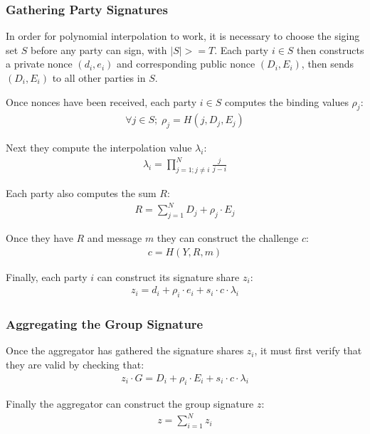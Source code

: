 \documentclass{article}
\begin{document}
\newpage
\onecolumn
\subsubsection{
  Gathering Party Signatures
}

In order for polynomial interpolation to work, it is necessary to choose the siging set $S$ before any party can sign, with $|S| >= T$.  Each party $i \in S$ then constructs a private nonce $(d_i,e_i)$ and corresponding public nonce $(D_i,E_i)$, then sends $(D_i,E_i)$ to all other parties in $S$.

Once nonces have been received, each party $i \in S$ computes the binding values $\rho_j$:
\begin{align}
  \forall j \in S;\;\rho_j = H(j, D_j, E_j)
\end{align}

Next they compute the interpolation value $\lambda_i$:
\begin{align}
  \lambda_i = \prod_{j=1; j \neq i}^{N} \frac{j}{j - i}
\end{align}

Each party also computes the sum $R$:
\begin{align}
  R = \sum_{j=1}^{N} D_j + \rho_j \cdot E_j
\end{align}

Once they have $R$ and message $m$ they can construct the challenge $c$:
\begin{align}
  c = H(Y, R, m)
\end{align}

Finally, each party $i$ can construct its signature share $z_i$:
\begin{align}
  z_i = d_i + \rho_i \cdot e_i + s_i \cdot c \cdot \lambda_i
\end{align}


\subsubsection{
  Aggregating the Group Signature
}

Once the aggregator has gathered the signature shares $z_i$, it must first verify that they are valid by checking that:
\begin{align}
  z_i \cdot G = D_i + \rho_i \cdot E_i + s_i \cdot c \cdot \lambda_i
\end{align}

Finally the aggregator can construct the group signature $z$:
\begin{align}
  z = \sum_{i=1}^{N} z_i
\end{align}
\end{document}
